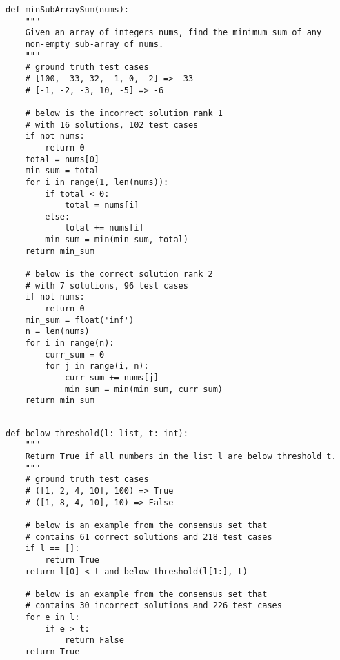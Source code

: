 \begin{lstlisting}[style=mypython,caption={Problem Misunderstanding}, label={lst:code3}, basicstyle=\tiny]
def minSubArraySum(nums):
    """
    Given an array of integers nums, find the minimum sum of any 
    non-empty sub-array of nums.
    """
    # ground truth test cases
    # [100, -33, 32, -1, 0, -2] => -33
    # [-1, -2, -3, 10, -5] => -6
    
    # below is the incorrect solution rank 1
    # with 16 solutions, 102 test cases
    if not nums:
        return 0
    total = nums[0]
    min_sum = total
    for i in range(1, len(nums)):
        if total < 0:
            total = nums[i]
        else:
            total += nums[i]
        min_sum = min(min_sum, total)
    return min_sum
    
    # below is the correct solution rank 2
    # with 7 solutions, 96 test cases
    if not nums:
        return 0
    min_sum = float('inf')
    n = len(nums)
    for i in range(n):
        curr_sum = 0
        for j in range(i, n):
            curr_sum += nums[j]
            min_sum = min(min_sum, curr_sum)
    return min_sum
    
\end{lstlisting}

\begin{lstlisting}[style=mypython, caption={Effectiveness of \ours}, label={lst:positive_code_1}, basicstyle=\tiny]
def below_threshold(l: list, t: int):
    """
    Return True if all numbers in the list l are below threshold t.
    """
    # ground truth test cases
    # ([1, 2, 4, 10], 100) => True
    # ([1, 8, 4, 10], 10) => False
    
    # below is an example from the consensus set that
    # contains 61 correct solutions and 218 test cases
    if l == []:
        return True
    return l[0] < t and below_threshold(l[1:], t)
    
    # below is an example from the consensus set that
    # contains 30 incorrect solutions and 226 test cases
    for e in l:
        if e > t:
            return False
    return True
\end{lstlisting}

